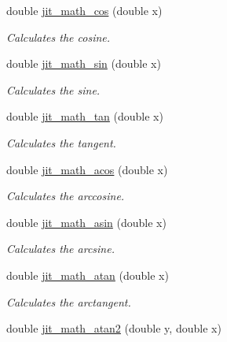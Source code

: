 \begin{DoxyCompactItemize}
\item 
double \hyperlink{group__mathmod_ga4be34e0f44fdf1f7d9e7fe5bab1e641b}{jit\_\-math\_\-cos} (double x)
\begin{DoxyCompactList}\small\item\em Calculates the cosine. \item\end{DoxyCompactList}\item 
double \hyperlink{group__mathmod_ga1e3fed4bd1ef0ab0332dbce530817c08}{jit\_\-math\_\-sin} (double x)
\begin{DoxyCompactList}\small\item\em Calculates the sine. \item\end{DoxyCompactList}\item 
double \hyperlink{group__mathmod_gacda64129c8745558f439f72c6f00897d}{jit\_\-math\_\-tan} (double x)
\begin{DoxyCompactList}\small\item\em Calculates the tangent. \item\end{DoxyCompactList}\item 
double \hyperlink{group__mathmod_ga965c3e237069987a81743e38f66c587f}{jit\_\-math\_\-acos} (double x)
\begin{DoxyCompactList}\small\item\em Calculates the arccosine. \item\end{DoxyCompactList}\item 
double \hyperlink{group__mathmod_ga2b5f79c1638e9d10bd1cbfd1295db9b9}{jit\_\-math\_\-asin} (double x)
\begin{DoxyCompactList}\small\item\em Calculates the arcsine. \item\end{DoxyCompactList}\item 
double \hyperlink{group__mathmod_gab038a3f232d7cbb8587a43b4146ed8f2}{jit\_\-math\_\-atan} (double x)
\begin{DoxyCompactList}\small\item\em Calculates the arctangent. \item\end{DoxyCompactList}\item 
double \hyperlink{group__mathmod_ga6c2322e36a35450f13c82b201d28f541}{jit\_\-math\_\-atan2} (double y, double x)

\end{DoxyCompactItemize}
